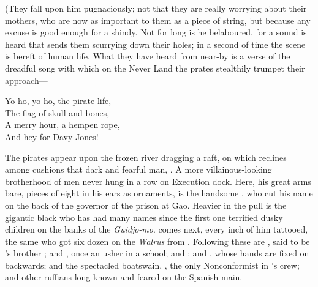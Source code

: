 \begin{stagedir}
(They fall upon him pugnaciously;
not that they are really worrying about their mothers, who are now as important to them as a piece of string,
but because any excuse is good enough for a shindy.
Not for long is he belaboured, for a sound is heard that sends them scurrying down their holes; in a second of time the scene is bereft of human life.
What they have heard from near-by is a verse of the dreadful song with which on the Never Land the prates stealthily trumpet their approach—

\begin{drama}
\speakercontinues
	Yo ho, yo ho, the pirate life,\\
	The flag of skull and bones,\\
	A merry hour, a hempen rope,\\
	And hey for Davy Jones!
\end{drama}

The pirates appear upon the frozen river dragging a raft,
on which reclines among cushions that dark and fearful man, .
A more villainous-looking brotherhood of men never hung in a row on Execution dock.
Here, his great arms bare, pieces of eight in his ears as ornaments, is the handsome \cecco, who cut his name on the back of the governor of the prison at Gao.
Heavier in the pull is the gigantic black who has had many names since the first one terrified dusky children on the banks of the \emph{Guidjo-mo}.
 comes next, every inch of him tattooed, the same \jukes who got six dozen on the \emph{Walrus} from .
Following these are \cookson, said to be 's brother ;
and , once an usher in a school;
and  ;
and \noodler, whose hands are fixed on backwards;
and the spectacled boatswain, \smee, the only Nonconformist in \hook's crew;
and other ruffians long known and feared on the Spanish main.


\end{stagedir}
